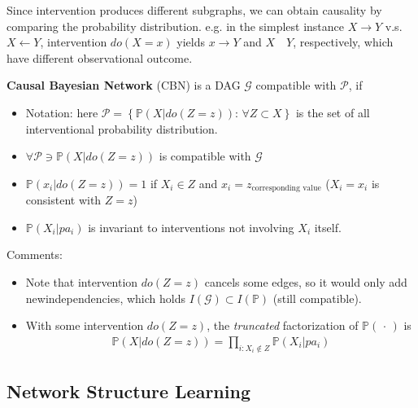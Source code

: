Since intervention produces different subgraphs, we can obtain causality by comparing the probability distribution. e.g. in the simplest instance $ X\to Y $ v.s. $ X\leftarrow Y $, intervention $ do(X=x) $ yields $ x\to Y $ and $ X\quad Y $, respectively, which have different observational outcome.

\textbf{Causal Bayesian Network} (CBN) is a DAG $ \mathcal{G} $ compatible with $ \mathcal{P} $, if 
\begin{itemize}[topsep=2pt,itemsep=0pt]
    \item Notation: here $ \mathcal{P}=\left\{ \mathbb{P}\left( X|do(Z=z) \right):\,\forall Z\subset X  \right\} $ is the set of all interventional probability distribution.
    \item $ \forall \mathcal{P}\ni \mathbb{P}\left( X|do(Z=z) \right)   $ is compatible with $ \mathcal{G} $
    \item $ \mathbb{P}\left( x_i|do(Z=z) \right)=1   $ if $ X_i\in Z $ and $ x_i=z_{\text{corresponding value}} $ ($ X_i=x_i $ is consistent with $ Z=z $)
    \item $ \mathbb{P}\left( X_i|pa_i \right)  $ is invariant to interventions not involving $ X_i $ itself.
\end{itemize}

Comments:
\begin{itemize}[topsep=2pt,itemsep=0pt]
    \item Note that intervention $ do(Z=z) $ cancels some edges, so it would only add newindependencies, which holds $ I(\mathcal{G})\subset I(\mathbb{P} ) $ (still compatible).
    \item With some intervention $ do(Z=z) $, the \textit{truncated} factorization of $ \mathbb{P}\left( \, \cdot \,  \right)  $ is
    \begin{align}
        \mathbb{P}\left( X | do(Z=z) \right)  =  \prod_{i:X_i\notin Z}\mathbb{P}\left( X_i|pa_i \right) 
    \end{align}
    
    
\end{itemize}

    

    








\subsection{Network Structure Learning}

